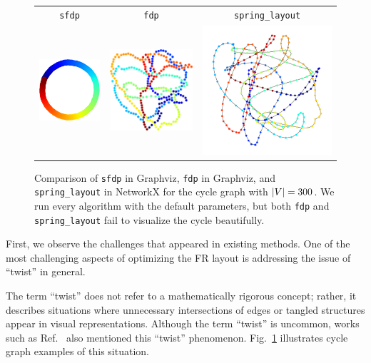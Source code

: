 \documentclass[dvipdfmx,journal]{IEEEtran}
\begin{document}
\begin{figure}[t]
  \centering
  \begin{tabular}{ccc}
    \texttt{sfdp}                                                   & \texttt{fdp} & \texttt{spring\_layout} \\
    \includegraphics[width=0.273\columnwidth]{cycle/cycle_sfdp.png} &
    \includegraphics[width=0.273\columnwidth]{cycle/cycle_fdp.png}  &
    \includegraphics[width=0.273\columnwidth]{cycle/cycle_fr.png}                                            \\
  \end{tabular}
  \caption{
    Comparison of \texttt{sfdp} in Graphviz, \texttt{fdp} in Graphviz, and \texttt{spring\_layout} in NetworkX for the cycle graph with $\abs{V} = 300$.
    We run every algorithm with the default parameters, but both \texttt{fdp} and \texttt{spring\_layout} fail to visualize the cycle beautifully.
  }
  \label{fig:cycle}
\end{figure}

First, we observe the challenges that appeared in existing methods.
One of the most challenging aspects of optimizing the FR layout is addressing the issue of ``twist'' in general.

The term ``twist'' does not refer to a mathematically rigorous concept; rather, it describes situations where unnecessary intersections of edges or tangled structures appear in visual representations.
Although the term ``twist'' is uncommon, works such as Ref.~\cite{cheongSnapshotVisualizationComplex2018} also mentioned this ``twist'' phenomenon. Fig.~\ref{fig:cycle} illustrates cycle graph examples of this situation.
\end{document}
